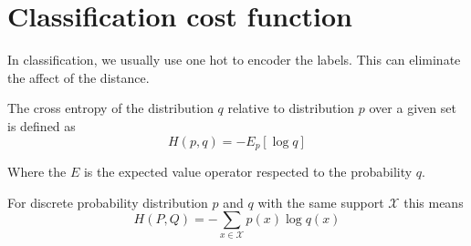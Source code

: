 \section{Classification cost function}
\label{sec:class-cost-funct}

In classification, we usually use one hot to encoder the labels.
This can eliminate the affect of the distance.


The cross entropy of the distribution \(q\) relative to distribution \(p\) over a given set is defined as
\begin{equation}
  \label{eq:10}
  H(p,q) = - E_{p}[\log q]
\end{equation}

Where the \(E\) is the expected value operator respected to the probability \(q\).


For discrete probability distribution \(p\) and \(q\) with the same support \(\mathcal{X}\) this means
\begin{equation}
  \label{eq:11}
  H(P, Q)=-\sum_{x \in \mathcal{X}} p(x) \log q(x)
\end{equation}



